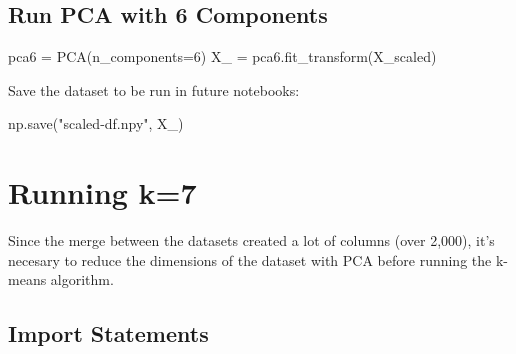 \documentclass[
  letterpaper,
  DIV=11,
  numbers=noendperiod]{scrreprt}
\newenvironment{Shaded}{\begin{snugshade}}{\end{snugshade}}
\newcommand{\DecValTok}[1]{\textcolor[rgb]{0.68,0.00,0.00}{#1}}
\newcommand{\NormalTok}[1]{\textcolor[rgb]{0.00,0.23,0.31}{#1}}
\newcommand{\OperatorTok}[1]{\textcolor[rgb]{0.37,0.37,0.37}{#1}}
\newcommand{\StringTok}[1]{\textcolor[rgb]{0.13,0.47,0.30}{#1}}
\begin{document}
\section{Run PCA with 6 Components}\label{run-pca-with-6-components}

\begin{Shaded}
\begin{Highlighting}[]
\NormalTok{pca6 }\OperatorTok{=}\NormalTok{ PCA(n\_components}\OperatorTok{=}\DecValTok{6}\NormalTok{)}
\NormalTok{X\_ }\OperatorTok{=}\NormalTok{ pca6.fit\_transform(X\_scaled)}
\end{Highlighting}
\end{Shaded}

Save the dataset to be run in future notebooks:

\begin{Shaded}
\begin{Highlighting}[]
\NormalTok{np.save(}\StringTok{"scaled{-}df.npy"}\NormalTok{, X\_)}
\end{Highlighting}
\end{Shaded}

\chapter{Running k=7}\label{running-k7}

Since the merge between the datasets created a lot of columns (over
2,000), it's necesary to reduce the dimensions of the dataset with PCA
before running the k-means algorithm.

\section{Import Statements}\label{import-statements-1}
\end{document}
